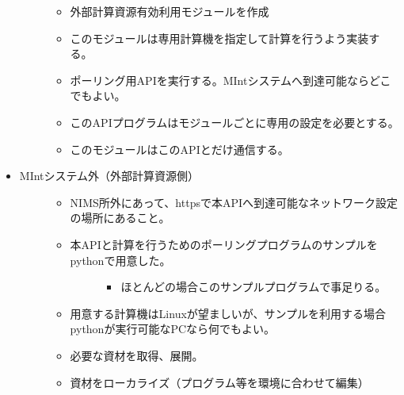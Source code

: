 \documentclass[letterpaper,10pt,dvipdfmx,openany]{sphinxmanual}
\begin{document}
\begin{itemize}
\begin{description}
\begin{itemize}
\item {} 
外部計算資源有効利用モジュールを作成

\item {} 
このモジュールは専用計算機を指定して計算を行うよう実装する。

\item {} 
ポーリング用APIを実行する。MIntシステムへ到達可能ならどこでもよい。

\item {} 
このAPIプログラムはモジュールごとに専用の設定を必要とする。

\item {} 
このモジュールはこのAPIとだけ通信する。

\end{itemize}

\end{description}

\item {} \begin{description}
\item[{MIntシステム外（外部計算資源側）}] \leavevmode\begin{itemize}
\item {} 
NIMS所外にあって、httpsで本APIへ到達可能なネットワーク設定の場所にあること。

\item {} \begin{description}
\item[{本APIと計算を行うためのポーリングプログラムのサンプルをpythonで用意した。}] \leavevmode\begin{itemize}
\item {} 
ほとんどの場合このサンプルプログラムで事足りる。

\end{itemize}

\end{description}

\item {} 
用意する計算機はLinuxが望ましいが、サンプルを利用する場合pythonが実行可能なPCなら何でもよい。

\item {} 
必要な資材を取得、展開。

\item {} 
資材をローカライズ（プログラム等を環境に合わせて編集）

\end{itemize}

\end{description}

\end{itemize}
\end{document}
